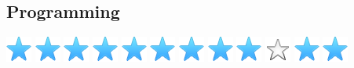 \documentclass[]{cv-class}
\begin{document}
\begin{aside}
  \section{Programming}
    {\includegraphics[scale=0.30]{img/star.png}
    \includegraphics[scale=0.30]{img/star.png}
    \includegraphics[scale=0.30]{img/star.png}
    \includegraphics[scale=0.30]{img/star.png}
    \includegraphics[scale=0.30]{img/star.png}}
    {\includegraphics[scale=0.30]{img/star.png}
    \includegraphics[scale=0.30]{img/star.png}
    \includegraphics[scale=0.30]{img/star.png}
    \includegraphics[scale=0.30]{img/star.png}
    \includegraphics[scale=0.30]{img/star_empty.png}}
    {\includegraphics[scale=0.30]{img/star.png}
    \includegraphics[scale=0.30]{img/star.png}
}
\end{aside}
\end{document}
